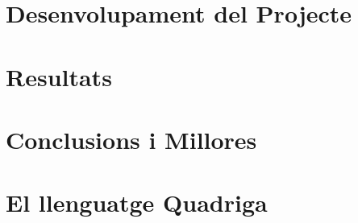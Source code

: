 \documentclass{article}
\begin{document}




\newpage
\tableofcontents



\newpage
\section{Desenvolupament del Projecte}

\newpage
\section{Resultats}

\newpage
\section{Conclusions i Millores}

\newpage
% 



\appendix
\newpage
\section{El llenguatge Quadriga}
\end{document}
